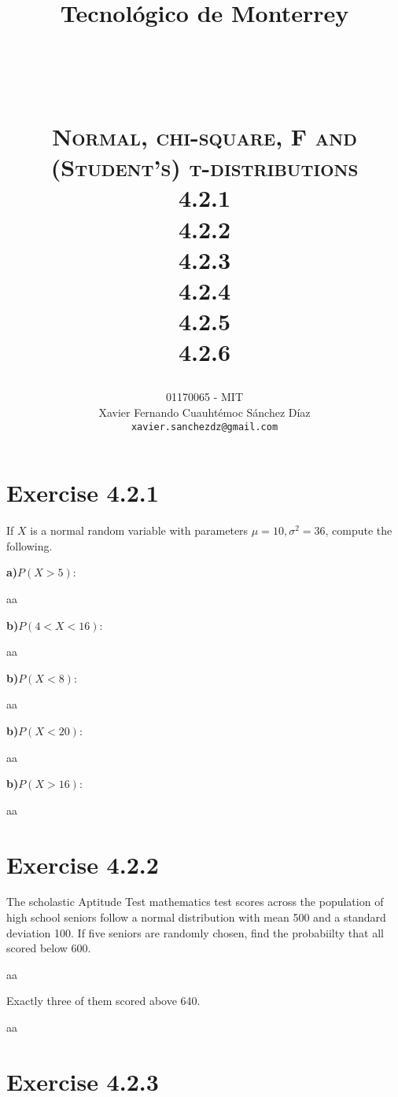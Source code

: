 \documentclass[titlepage, letterpaper, fleqn]{article}
\title{
\vspace{1in}
\textbf{Tecnológico de Monterrey} \\
\vspace{0.5in}
\textmd{\mahclass} \\
\large{\textit{\mahteacher}} \\
\vspace{0.5in}
\textsc{\mahtitle}\\
\textsc{Normal, chi-square, F and (Student's) t-distributions}\\
\textsc{4.2.1}\\
\textsc{4.2.2}\\
\textsc{4.2.3}\\
\textsc{4.2.4}\\
\textsc{4.2.5}\\
\textsc{4.2.6}\\
\author{01170065  - MIT \\
Xavier Fernando Cuauhtémoc Sánchez Díaz \\
\texttt{xavier.sanchezdz@gmail.com}}
\date{\mahdate}
}
\newcommand{\spacepls}{\vspace{5mm}}
\begin{document}
\begin{titlepage}
\maketitle
\end{titlepage}

%
%

\section{Exercise 4.2.1}

{\large If $X$ is a normal random variable with parameters $\mu = 10, \sigma^2 = 36$, compute the following.

\textbf{a)}$P(X > 5)$:}

aa

\spacepls

{\large \textbf{b)}$P(4 < X < 16)$:}

aa

\spacepls

{\large \textbf{b)}$P(X < 8)$:}

aa

\spacepls

{\large \textbf{b)}$P(X < 20)$:}

aa

\spacepls

{\large \textbf{b)}$P(X > 16)$:}

aa

\spacepls

\section{Exercise 4.2.2}

{\large The scholastic Aptitude Test mathematics test scores across the population of high school seniors follow a normal distribution with mean 500 and a standard deviation 100.
If five seniors are randomly chosen, find the probabiilty that all scored below 600.}

aa

\spacepls

{\large Exactly three of them scored above 640.}

aa

\spacepls

\section{Exercise 4.2.3}
\end{document}
